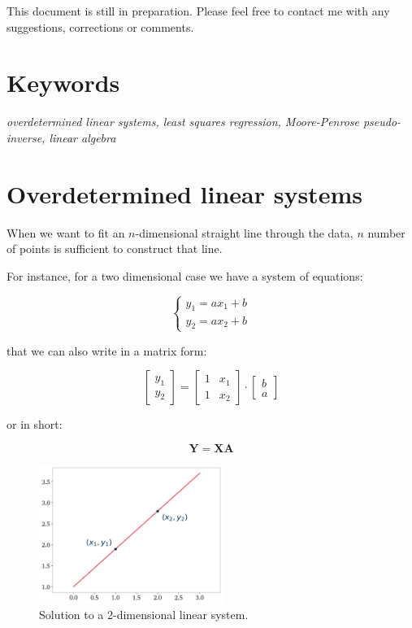 \documentclass[10pt,twocolumn]{article}
\begin{document}
This document is still in preparation. Please feel free to contact me with any suggestions, corrections or comments.

\section*{Keywords}

\textit{overdetermined linear systems, least squares regression, Moore-Penrose pseudo-inverse, linear algebra}

\tableofcontents


\section{Overdetermined linear systems}

When we want to fit an $n$-dimensional straight line through the data, $n$ number of points is sufficient to construct that line.

For instance, for a two dimensional case we have a system of equations:

\begin{equation}
\begin{cases}
y_1 = a x_1 + b \\
y_2 = a x_2 + b
\end{cases}
\end{equation}

that we can also write in a matrix form:

\begin{equation}
\begin{bmatrix}
y_1 \\
y_2
\end{bmatrix}
=
\begin{bmatrix}
1 & x_1 \\
1 & x_2
\end{bmatrix}
\cdot
\begin{bmatrix}
b \\
a
\end{bmatrix}
\end{equation}

or in short:

\begin{equation} \label{eq:general_linear_equation}
\bm{Y} = \bm{X}\bm{A}
\end{equation}

\begin{figure}[H]
\centering\includegraphics[width=6cm]{overdetermined-systems-figure-1.png}
\caption{Solution to a 2-dimensional linear system.}
\label{fig:linear-system-solution}
\end{figure}
\end{document}
